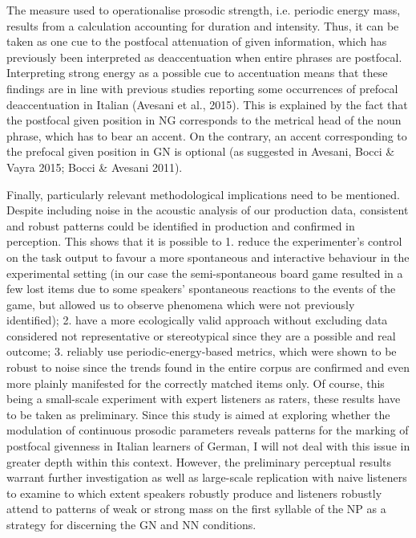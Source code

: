 \begin{styleStandard}
The measure used to operationalise prosodic strength, i.e. periodic energy mass, results from a calculation accounting for duration and intensity. Thus, it can be taken as one cue to the postfocal attenuation of given information, which has previously been interpreted as deaccentuation when entire phrases are postfocal. Interpreting strong energy as a possible cue to accentuation means that these findings are in line with previous studies reporting some occurrences of prefocal deaccentuation in Italian (Avesani et al., 2015). This is explained by the fact that the postfocal given position in NG corresponds to the metrical head of the noun phrase, which has to bear an accent. On the contrary, an accent corresponding to the prefocal given position in GN is optional (as suggested in Avesani, Bocci \& Vayra 2015; Bocci \& Avesani 2011).
\end{styleStandard}

\begin{styleStandard}
Finally, particularly relevant methodological implications need to be mentioned. Despite including noise in the acoustic analysis of our production data, consistent and robust patterns could be identified in production and confirmed in perception. This shows that it is possible to 1. reduce the experimenter’s control on the task output to favour a more spontaneous and interactive behaviour in the experimental setting (in our case the semi-spontaneous board game resulted in a few lost items due to some speakers’ spontaneous reactions to the events of the game, but allowed us to observe phenomena which were not previously identified); 2. have a more ecologically valid approach without excluding data considered not representative or stereotypical since they are a possible and real outcome; 3. reliably use periodic-energy-based metrics, which were shown to be robust to noise since the trends found in the entire corpus are confirmed and even more plainly manifested for the correctly matched items only. Of course, this being a small-scale experiment with expert listeners as raters, these results have to be taken as preliminary. Since this study is aimed at exploring whether the modulation of continuous prosodic parameters reveals patterns for the marking of postfocal givenness in Italian learners of German, I will not deal with this issue in greater depth within this context. However, the preliminary perceptual results warrant further investigation as well as large-scale replication with naive listeners to examine to which extent speakers robustly produce and listeners robustly attend to patterns of weak or strong mass on the first syllable of the NP as a strategy for discerning the GN and NN conditions.
\end{styleStandard}

